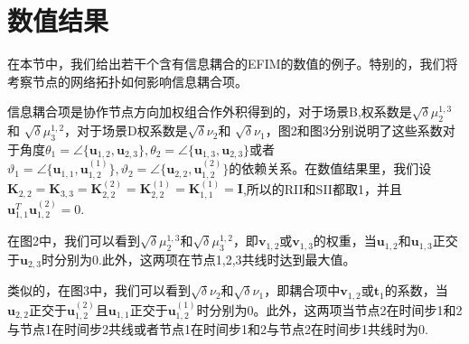 \section{数值结果}
在本节中，我们给出若干个含有信息耦合的EFIM的数值的例子。特别的，我们将考察节点的网络拓扑如何影响信息耦合项。

信息耦合项是协作节点方向加权组合作外积得到的，对于场景B,权系数是$\sqrt{\delta}\mu_2^{1,3}$和
$\sqrt{\delta}\mu_3^{1,2}$，对于场景D权系数是$\sqrt{\delta}\nu_2$和
$\sqrt{\delta}\nu_1$，图2和图3分别说明了这些系数对于角度$\theta_1=\angle \{\bm{u}_{1,2},\bm{u}_{2,3}\},\theta_2=\angle \{\bm{u}_{1,3},\bm{u}_{2,3}\}$或者$\vartheta_1=\angle \{\bm{u}_{1,1},\bm{u}_{1,2}^{(1)}\},\vartheta_2=\angle \{\bm{u}_{2,2},\bm{u}_{1,2}^{(2)}\}$的依赖关系。在数值结果里，我们设
$\bm{K}_{2,2}=\bm{K}_{3,3}=\bm{K}_{2,2}^{(2)}=\bm{K}_{2,2}^{(1)}=\bm{K}_{1,1}^{(1)}=\bm{I}$,所以的RII和SII都取1，并且$\bm{u}_{1,1}^T\bm{u}_{1,2}^{(2)}=0$.

在图2中，我们可以看到$\sqrt{\delta}\mu_2^{1,3}$和$\sqrt{\delta}\mu_3^{1,2}$，即$\bm{v}_{1,2}$或$\bm{v}_{1,3}$的权重，当$\bm{u}_{1,2}$和$\bm{u}_{1,3}$正交于$\bm{u}_{2,3}$时分别为0.此外，这两项在节点1,2,3共线时达到最大值。

类似的，在图3中，我们可以看到$\sqrt{\delta}\nu_2$和$\sqrt{\delta}\nu_1$，即耦合项中$\bm{v}_{1,2}$或$\bm{t}_1$的系数，当$\bm{u}_{2,2}$正交于$\bm{u}_{1,2}^{(2)}$且$\bm{u}_{1,1}$正交于$\bm{u}_{1,2}^{(1)}$时分别为0。此外，这两项当节点2在时间步1和2与节点1在时间步2共线或者节点1在时间步1和2与节点2在时间步1共线时为0.
%
%